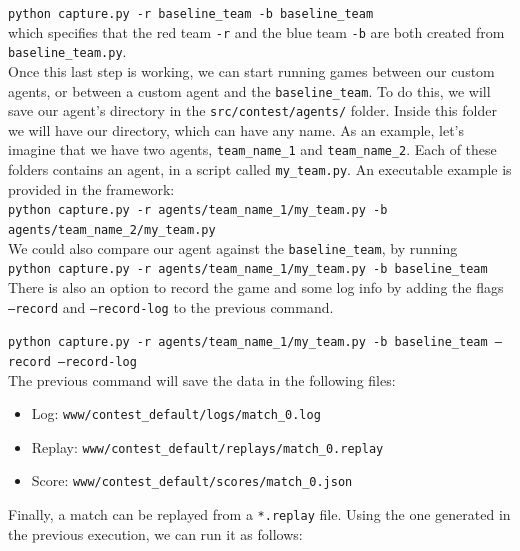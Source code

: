 \documentclass[11pt]{article}
\begin{document}
\texttt{python capture.py -r baseline\_team -b baseline\_team}
\\

which specifies that the red team \texttt{-r} and the blue team \texttt{-b} are both created from \texttt{baseline\_team.py}. \\

Once this last step is working, we can start running games between our custom agents, or between a custom agent and the \texttt{baseline\_team}. To do this, we will save our agent's directory in the \texttt{src/contest/agents/} folder. Inside this folder we will have our directory, which can have any name. As an example, let's imagine that we have two agents, \texttt{team\_name\_1} and \texttt{team\_name\_2}. Each of these folders contains an agent, in a script called \texttt{my\_team.py}.
An executable example is provided in the framework: 
\\

\texttt{python capture.py -r agents/team\_name\_1/my\_team.py -b agents/team\_name\_2/my\_team.py}
\\

We could also compare our agent against the \texttt{baseline\_team}, by running
\\

\texttt{python capture.py -r agents/team\_name\_1/my\_team.py -b baseline\_team}
\\

There is also an option to record the game and some log info by adding the flags \texttt{--record} and \texttt{--record-log} to the previous command. 

\texttt{python capture.py -r agents/team\_name\_1/my\_team.py -b baseline\_team --record --record-log}
\\

The previous command will save the data in the following files:
\begin{itemize}
    \item Log: \texttt{www/contest\_default/logs/match\_0.log}
    \item Replay: \texttt{www/contest\_default/replays/match\_0.replay}
    \item Score: \texttt{www/contest\_default/scores/match\_0.json}
\end{itemize}

Finally, a match can be replayed from a \texttt{*.replay} file. Using the one generated in the previous execution, we can run it as follows:
\end{document}
